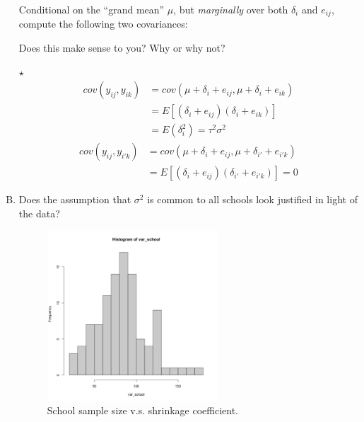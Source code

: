 \documentclass[11pt]{article}
\newcommand{\jie}{$\star$ }
\begin{document}
\begin{enumerate}[(A)]
Conditional on the ``grand mean'' $\mu$, but \emph{marginally} over both $\delta_i$ and $e_{ij}$, compute the following two covariances:


Does this make sense to you?  Why or why not?  

\bigskip
\jie
\begin{align*}
    cov(y_{ij}, y_{ik}) &= cov(\mu + \delta_i + e_{ij}, \mu + \delta_i + e_{ik}) \\
    &= E[(\delta_i + e_{ij})(\delta_i + e_{ik})] \\
    &= E(\delta_i^2) = \tau^2 \sigma^2
\end{align*}
\begin{align*}
    cov(y_{ij}, y_{i'k}) &= cov(\mu + \delta_i + e_{ij}, \mu + \delta_{i'} + e_{i'k}) \\
    &=E[(\delta_i + e_{ij})(\delta_{i'} + e_{i'k})] = 0
\end{align*}

\item Does the assumption that $\sigma^2$ is common to all schools look justified in light of the data?  
\begin{figure}[h]
    \centering
    \includegraphics[width=0.6\textwidth]{Ex4/figures/var_school.jpeg}
    \caption{School sample size v.s. shrinkage coefficient.}
    \label{fig:bary_n}
\end{figure}


\end{enumerate}
\end{document}
